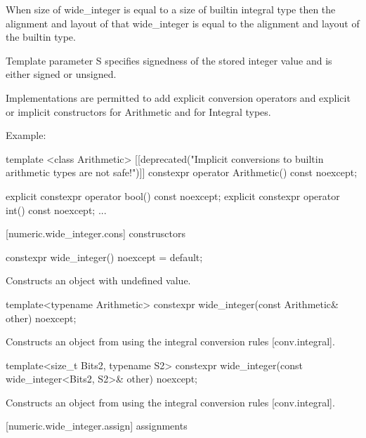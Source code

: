 When size of wide_integer is equal to a size of builtin integral type then the alignment and layout of that wide_integer is equal to the alignment and layout of the builtin type.

Template parameter S specifies signedness of the stored integer value and is either signed or unsigned.

Implementations are permitted to add explicit conversion operators and explicit or implicit constructors for Arithmetic and for Integral types.

Example:

\begin{codeblock}
template <class Arithmetic>
[[deprecated("Implicit conversions to builtin arithmetic types are not safe!")]]
  constexpr operator Arithmetic() const noexcept;

explicit constexpr operator bool() const noexcept;
explicit constexpr operator int() const noexcept;
...
\end{codeblock}


[numeric.wide_integer.cons]{ construsctors}

\begin{itemdecl}
constexpr wide_integer() noexcept = default;
\end{itemdecl}

\begin{itemdescr}
\effects Constructs an object with undefined value.
\end{itemdescr}

\begin{itemdecl}
template<typename Arithmetic>
  constexpr wide_integer(const Arithmetic& other) noexcept;
\end{itemdecl}

\begin{itemdescr}
\effects Constructs an object from  using the integral conversion rules [conv.integral].
\end{itemdescr}

\begin{itemdecl}
template<size_t Bits2, typename S2> 
  constexpr wide_integer(const wide_integer<Bits2, S2>& other) noexcept;
\end{itemdecl}

\begin{itemdescr}
\effects Constructs an object from  using the integral conversion rules [conv.integral].
\end{itemdescr}

[numeric.wide_integer.assign]{ assignments}

